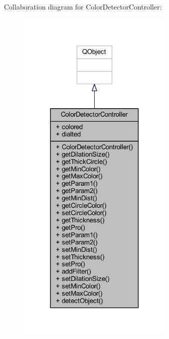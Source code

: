 Collaboration diagram for Color\+Detector\+Controller\+:\nopagebreak
\begin{figure}[H]
\begin{center}
\leavevmode
\includegraphics[width=212pt]{d6/d72/class_color_detector_controller__coll__graph}
\end{center}
\end{figure}
